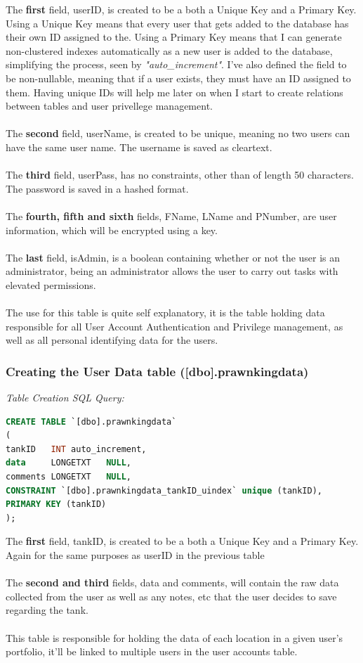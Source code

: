 \documentclass[a4paper,11pt]{proc}
\begin{document}
The \textbf{first} field, userID, is created to be a both a Unique Key and a Primary Key. Using a Unique Key means that every user that gets added to the database has their own ID assigned to the. Using a Primary Key means that I can generate non-clustered indexes automatically as a new user is added to the database, simplifying the process, seen by \textit{"auto\_increment"}. I've also defined the field to be non-nullable, meaning that if a user exists, they must have an ID assigned to them. Having unique IDs will help me later on when I start to create relations between tables and user privellege management.\\
\\The \textbf{second} field, userName, is created to be unique, meaning no two users can have the same user name. The username is saved as cleartext.\\
\\The \textbf{third} field, userPass, has no constraints, other than of length 50 characters. The password is saved in a hashed format.\\
\\The \textbf{fourth, fifth and sixth} fields, FName, LName and PNumber, are user information, which will be encrypted using a key.\\
\\The \textbf{last} field, isAdmin, is a boolean containing whether or not the user is an administrator, being an administrator allows the user to carry out tasks with elevated permissions.\\
\\The use for this table is quite self explanatory, it is the table holding data responsible for all User Account Authentication and Privilege management, as well as all personal identifying data for the users.
\subsubsection{Creating the User Data table ([dbo].prawnkingdata)}
\textit{Table Creation SQL Query:}
\begin{lstlisting}[language=SQL,
deletekeywords={IDENTITY,INT},
morekeywords={clustered,LONGETXT},    
framesep=10pt,
framextopmargin=10pt]
CREATE TABLE `[dbo].prawnkingdata`
(
tankID   INT auto_increment,
data     LONGETXT   NULL,
comments LONGETXT   NULL,
CONSTRAINT `[dbo].prawnkingdata_tankID_uindex` unique (tankID),
PRIMARY KEY (tankID)
);
\end{lstlisting}
The \textbf{first} field, tankID, is created to be a both a Unique Key and a Primary Key. Again for the same purposes as userID in the previous table\\
\\The \textbf{second and third} fields, data and comments, will contain the raw data collected from the user as well as any notes, etc that the user decides to save regarding the tank.\\
\\This table is responsible for holding the data of each location in a given user's portfolio, it'll be linked to multiple users in the user accounts table.
\end{document}
